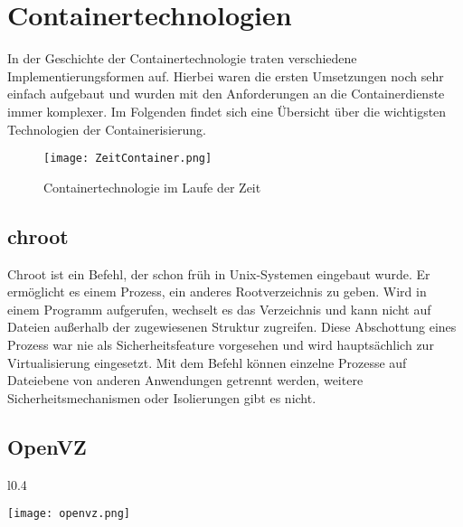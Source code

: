 \section{Containertechnologien} 
\label{sec:Containertechnologien}

In der Geschichte der Containertechnologie traten verschiedene Implementierungsformen auf.
Hierbei waren die ersten Umsetzungen noch sehr einfach aufgebaut und wurden mit den Anforderungen an die Containerdienste immer komplexer.
Im Folgenden findet sich eine Übersicht über die wichtigsten Technologien der Containerisierung.

\begin{figure}[H]
	\begin{center}
		\texttt{[image: ZeitContainer.png]}
	\end{center}
	\caption[Containertechnologie im Laufe der Zeit]{Containertechnologie im Laufe der Zeit}
	\label{fig:CTZeit}
\end{figure}


\subsection{chroot}
\label{sec:chroot}

Chroot ist ein Befehl, der schon früh in Unix-Systemen eingebaut wurde.
Er ermöglicht es einem Prozess, ein anderes Rootverzeichnis zu geben.
Wird in einem Programm  aufgerufen, wechselt es das Verzeichnis und kann nicht auf Dateien außerhalb der zugewiesenen Struktur zugreifen.
Diese Abschottung eines Prozess war nie als Sicherheitsfeature vorgesehen und wird hauptsächlich zur Virtualisierung eingesetzt.
Mit dem Befehl können einzelne Prozesse auf Dateiebene von anderen Anwendungen getrennt werden, weitere Sicherheitsmechanismen oder Isolierungen gibt es nicht.\cite{IEEE7830207,569694, MANPAGE01}
\newpage
\subsection{OpenVZ}
\label{sec:OpenVZ}

\begin{wrapfigure}{l}{0.4\textwidth}
	\vspace{-40pt}
	\begin{center}
		\texttt{[image: openvz.png]}
	\end{center}
	\vspace{-15pt}
	\caption[Logo OpenVZ]{ \footnotemark}
	\label{fig:openvz}
	\vspace{-30pt}
\end{wrapfigure}

